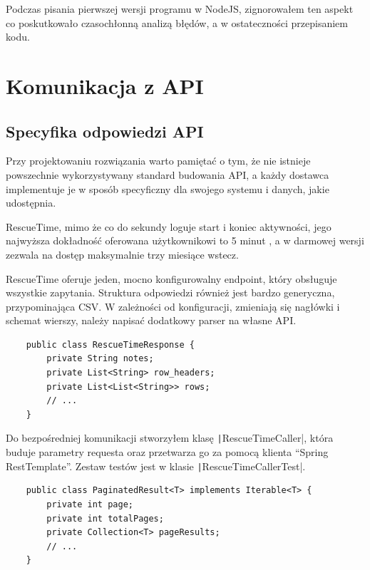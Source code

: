 \documentclass[openright]{xmgr}
\begin{document}
            Podczas pisania pierwszej wersji programu w NodeJS, zignorowałem ten aspekt co poskutkowało czasochłonną analizą błędów,
            a w ostateczności przepisaniem kodu.


    \section{Komunikacja z API}

        \subsection*{Specyfika odpowiedzi API}
            Przy projektowaniu rozwiązania warto pamiętać o tym, że nie istnieje powszechnie wykorzystywany standard budowania API,
            a każdy dostawca implementuje je w sposób specyficzny dla swojego systemu i danych, jakie udostępnia.

            RescueTime, mimo że co do sekundy loguje start i koniec aktywności,
            jego najwyższa dokładność oferowana użytkownikowi to 5 minut \cite{rescuetime:apidoc-precision},
            a w darmowej wersji zezwala na dostęp maksymalnie trzy miesiące wstecz.

            RescueTime oferuje jeden, mocno konfigurowalny endpoint, który obsługuje wszystkie zapytania.
            Struktura odpowiedzi również jest bardzo generyczna, przypominająca CSV.
            W zależności od konfiguracji, zmieniają się nagłówki i schemat wierszy, należy napisać dodatkowy parser na własne API.

            \begin{verbatim}
    public class RescueTimeResponse {
        private String notes;
        private List<String> row_headers;
        private List<List<String>> rows;
        // ...
    }
            \end{verbatim}

            Do bezpośredniej komunikacji stworzyłem klasę \texttt|RescueTimeCaller|, która buduje parametry requesta
            oraz przetwarza go za pomocą klienta ``Spring RestTemplate''. Zestaw testów jest w klasie \texttt|RescueTimeCallerTest|.

            \begin{verbatim}
    public class PaginatedResult<T> implements Iterable<T> {
        private int page;
        private int totalPages;
        private Collection<T> pageResults;
        // ...
    }
            \end{verbatim}
\end{document}
